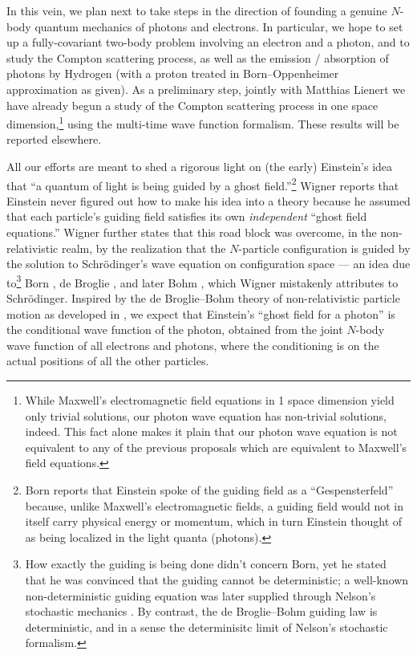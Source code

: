 \documentclass[11pt]{article}
\theoremstyle{definition}
\numberwithin{equation}{section}
\begin{document}
 In this vein, we plan next to take steps in the direction of founding a genuine $N$-body quantum mechanics of 
photons and electrons.
 In particular, we hope to set up a fully-covariant two-body problem involving an electron and a photon, and to study
the Compton scattering process, as well as the emission / absorption of photons by Hydrogen (with a proton treated in 
Born--Oppenheimer approximation as given).
 As a preliminary step, jointly with Matthias Lienert we have already begun a study of the Compton scattering process in 
one space dimension,\footnote{While Maxwell's electromagnetic field equations in 1 space dimension yield only
  trivial solutions, our photon wave equation has non-trivial solutions, indeed.
  This fact alone makes it plain that our photon wave equation is not equivalent to any of the previous proposals which are 
   equivalent to Maxwell's field equations.}
using the multi-time wave function formalism.
  These results will be reported elsewhere.

 All our efforts are meant to shed a rigorous light on (the early) Einstein's idea that ``a quantum of light is being guided by a 
ghost field.''\footnote{Born \cite{BornsPSISQUAREpapersA,BornsPSISQUAREpapersB} reports that Einstein spoke of the guiding
 field as a ``Gespensterfeld'' because, unlike Maxwell's electromagnetic fields, a guiding field would not in itself carry 
 physical energy or momentum, which in turn Einstein thought of as being localized in the light quanta (photons).} 
 Wigner \cite{WignerCollectedWorks} reports that Einstein never figured out how to make his idea into a theory because he 
assumed that each particle's guiding field satisfies its own \emph{independent} ``ghost field equations.'' 
 Wigner further states that this road block was overcome, in the non-relativistic realm, by the realization that the 
$N$-particle configuration is guided by the solution to Schr\"odinger's wave equation on configuration space --- 
an idea due to\footnote{\label{fn:BdBB}How exactly the guiding is being done didn't concern Born, yet he stated that he 
was convinced that the guiding cannot be deterministic; a well-known non-deterministic guiding equation was later supplied 
through Nelson's stochastic mechanics \cite{NelsonA,NelsonB}.
  By contrast, the de Broglie--Bohm guiding law is deterministic, and in a sense the determinisitc limit of Nelson's stochastic 
formalism.}
Born \cite{BornsPSISQUAREpapersA,BornsPSISQUAREpapersB}, de Broglie \cite{deBroglieSOLVAY}, and later Bohm \cite{Bohm52}, 
which Wigner mistakenly attributes to Schr\"odinger. 
 Inspired by the de Broglie--Bohm theory of non-relativistic particle motion as developed in \cite{DGZ}, we expect 
that Einstein's ``ghost field for a photon'' is the conditional wave function of the photon, obtained from
the joint $N$-body wave function of all electrons and photons, where the conditioning is on the actual positions of all the other particles.
 
\end{document}
